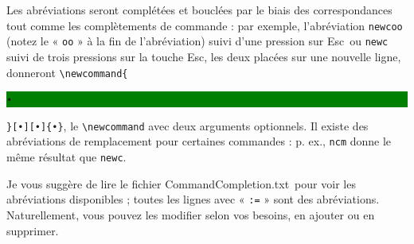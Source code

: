 \documentclass[11pt,french]{article}
\newcommand{\esckey}{\textsf{Esc}}
\newcommand{\selmark}{\colorbox{green}{\rule[-0.5ex]{0ex}{2.1ex}\texttt{•}}}
\newcommand{\CCT}{\textsf{CommandCompletion.txt}}
\begin{document}

Les abréviations seront complétées et bouclées par le biais des correspondances tout comme les complètements de 
commande : par exemple, l'abréviation \texttt{newcoo} (notez le « \texttt{oo} » à la fin de l'abréviation) suivi 
d'une pression sur \esckey\ ou \texttt{newc} suivi de trois pressions sur la touche \esckey{}, les deux placées sur une nouvelle ligne, donneront \verb|\newcommand{|\selmark\verb|}[•][•]{•}|, le \verb|\newcommand| avec deux arguments optionnels. Il existe des abréviations de remplacement pour certaines commandes : p. ex., \texttt{ncm} donne le même résultat que  \texttt{newc}. 

Je vous suggère de lire le fichier \CCT\ pour voir les abréviations disponibles ; toutes les lignes avec « \kern-1.7pt\texttt{:=} » sont des abréviations. Naturellement, vous pouvez les modifier selon vos besoins, en ajouter ou 
en supprimer.

%
\end{document}
